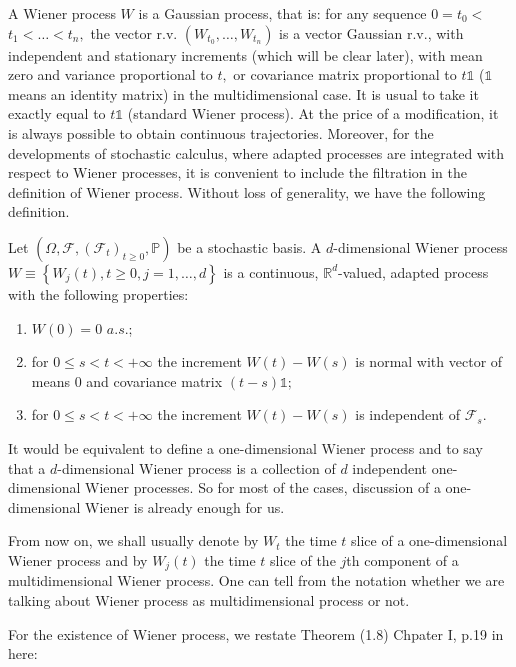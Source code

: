 A Wiener process $W$ is a Gaussian process, that is: for any sequence $0=t_{0}<$ $t_{1}<\ldots<t_{n},$ the vector r.v. $\left(W_{t_{0}}, \ldots, W_{t_{n}}\right)$ is a vector Gaussian r.v., with independent and stationary increments (which will be clear later), with mean zero and variance proportional to $t,$ or covariance matrix proportional to $t \mathbb{1}$ ($ \mathbb{1} $ means an identity matrix) in the multidimensional case. It is usual to take it exactly equal to $t \mathbb{1}$ (standard Wiener process). At the price of a modification, it is always possible to obtain continuous trajectories. Moreover, for the developments of stochastic calculus, where adapted processes are integrated with respect to Wiener processes, it is convenient to include the filtration in the definition of Wiener process. Without loss of generality, we have the following definition.
\begin{definition}
	Let $\left(\Omega, \mathcal{F},\left(\mathcal{F}_{t}\right)_{t \geq 0}, \mathbb{P}\right)$ be a stochastic basis. A $ d $-dimensional Wiener process $W \equiv\left\{W_{j}(t), t \geq 0, j=1, \ldots, d\right\}$ is a continuous, $\mathbb{R}^{d}$-valued, adapted process with the following properties:
	\begin{enumerate}
		\item $W(0)=0$ $a.s.$;
		\item for $0 \leq s<t<+\infty$ the increment $W(t)-W(s)$ is normal with vector of means 0 and covariance matrix $(t-s) \mathbb{1} ;$
		\item for $0 \leq s<t<+\infty$ the increment $W(t)-W(s)$ is independent of $\mathcal{F}_{s}$.
	\end{enumerate}
\end{definition}
\begin{remark}
	It would be equivalent to define a one-dimensional Wiener process and to say that a $ d $-dimensional Wiener process is a collection of $d$ independent one-dimensional Wiener processes. So for most of the cases, discussion of a one-dimensional Wiener is already enough for us.
\end{remark}
 From now on, we  shall usually denote by $ W_t $ the time $ t $ slice of a one-dimensional Wiener process and by $ W_{j}(t) $ the time $ t $ slice of the $ j $th component of a multidimensional Wiener process. One can tell from the notation whether we are talking about Wiener process as multidimensional process or not.

For the existence of Wiener process, we restate Theorem (1.8) Chpater I, p.19 in \cite{revuz2013continuous} here:


